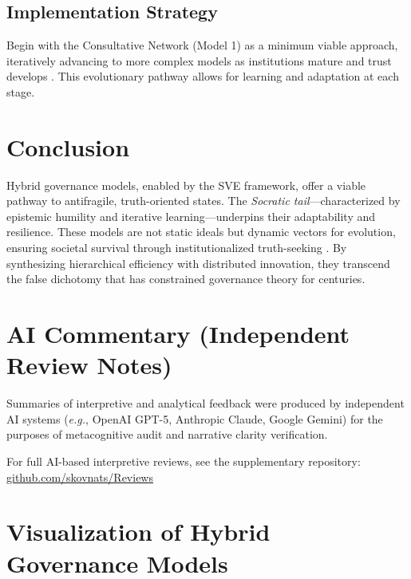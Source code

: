 \documentclass[11pt,a4paper]{article}
\begin{document}
\subsection{Implementation Strategy}
Begin with the Consultative Network (Model 1) as a minimum viable approach, iteratively advancing to more complex models as institutions mature and trust develops \citep[lines 2335--2336]{HybridModelsMemo}. This evolutionary pathway allows for learning and adaptation at each stage.

\section{Conclusion}
Hybrid governance models, enabled by the SVE framework, offer a viable pathway to antifragile, truth-oriented states. The \textit{Socratic tail}—characterized by epistemic humility and iterative learning—underpins their adaptability and resilience. These models are not static ideals but dynamic vectors for evolution, ensuring societal survival through institutionalized truth-seeking \citep[lines 2337--2338]{HybridModelsMemo}. By synthesizing hierarchical efficiency with distributed innovation, they transcend the false dichotomy that has constrained governance theory for centuries.

\section*{AI Commentary (Independent Review Notes)}
Summaries of interpretive and analytical feedback were produced by independent AI systems 
(\textit{e.g.}, OpenAI GPT-5, Anthropic Claude, Google Gemini) 
for the purposes of metacognitive audit and narrative clarity verification.  

For full AI-based interpretive reviews, see the supplementary repository:  
\href{https://codeberg.org/skovnats/SVE-Systemic-Verification-Engineering/tree/master/Reviews}{github.com/skovnats/Reviews}





\clearpage
\appendix

\section{Visualization of Hybrid Governance Models}
\label{app:visualization}
\end{document}
